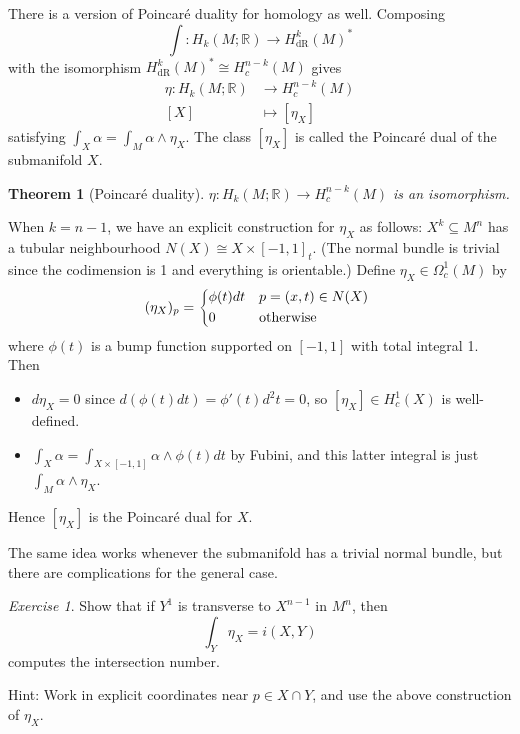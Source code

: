 \documentclass[a4paper]{article}
\newtheorem*{theorem}{Theorem}
\theoremstyle{definition}
\theoremstyle{remark}
\newtheorem*{exercise}{Exercise}
\newcommand{\dR}{\text{dR}}
\newcommand{\R}{\mathbb{R}}
\begin{document}
There is a version of Poincar\'e duality for homology as well. Composing
\begin{equation*}
    \int : H_k(M;\R) \to H^k_\dR(M)^*
\end{equation*}
with the isomorphism $H^k_\dR(M)^*\cong H^{n-k}_c(M)$ gives
\begin{align*}
    \eta : H_k(M;\R) &\to H^{n-k}_c(M) \\
    [X] &\mapsto [\eta_X]
\end{align*}
satisfying $\int_X\alpha=\int_M\alpha\wedge\eta_X$. The class $[\eta_X]$ is
called the Poincar\'e dual of the submanifold $X$.

\begin{theorem}[Poincar\'e duality]
    $\eta:H_k(M;\R)\to H^{n-k}_c(M)$ is an isomorphism.
\end{theorem}

When $k=n-1$, we have an explicit construction for $\eta_X$ as follows:
$X^k\subseteq M^n$ has a tubular neighbourhood $N(X)\cong X\times[-1,1]_t$. (The
normal bundle is trivial since the codimension is 1 and everything is
orientable.) Define $\eta_X\in\Omega^1_c(M)$ by
\begin{equation*}
    (\eta_X)_p = \begin{dcases*}
        \phi(t)dt & $p=(x,t)\in N(X)$ \\
        0 & otherwise
    \end{dcases*}
\end{equation*}
where $\phi(t)$ is a bump function supported on $[-1,1]$ with total integral 1.
Then
\begin{itemize}
    \item $d\eta_X=0$ since $d(\phi(t)dt)=\phi'(t)d^2t=0$, so
        $[\eta_X]\in H^1_c(X)$ is well-defined.

    \item $\int_X\alpha=\int_{X\times[-1,1]}\alpha\wedge\phi(t)dt$ by Fubini,
        and this latter integral is just $\int_M\alpha\wedge\eta_X$.
\end{itemize}
Hence $[\eta_X]$ is the Poincar\'e dual for $X$.

The same idea works whenever the submanifold has a trivial normal bundle, but
there are complications for the general case.

\begin{exercise}
    Show that if $Y^1$ is transverse to $X^{n-1}$ in $M^n$, then
    \begin{equation*}
        \int_Y\eta_X = i(X,Y)
    \end{equation*}
    computes the intersection number.

    Hint: Work in explicit coordinates near $p\in X\cap Y$, and use the above
    construction of $\eta_X$.
\end{exercise}
\end{document}
